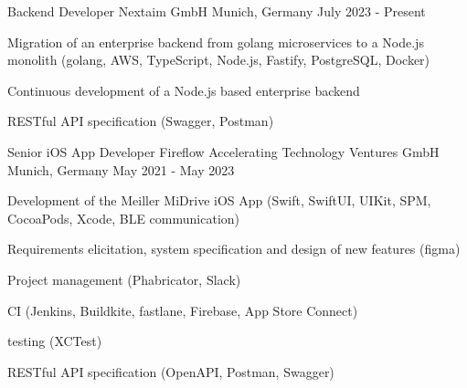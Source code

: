 


\begin{cventries}


\cventry
{Backend Developer} %
{Nextaim GmbH} %
{Munich, Germany} %
{July 2023 - Present} %
{ %
\begin{cvitems}
\item {Migration of an enterprise backend from golang microservices to a Node.js monolith (golang, AWS, TypeScript, Node.js, Fastify, PostgreSQL, Docker)}
\item {Continuous development of a Node.js based enterprise backend}
\item {RESTful API specification (Swagger, Postman)}
\end{cvitems}
}


\cventry
{Senior iOS App Developer} %
{Fireflow Accelerating Technology Ventures GmbH} %
{Munich, Germany} %
{May 2021 - May 2023} %
{ %
\begin{cvitems}
\item {Development of the Meiller MiDrive iOS App (Swift, SwiftUI, UIKit, SPM, CocoaPods, Xcode, BLE communication)}
\item {Requirements elicitation, system specification and design of new features (figma)}
\item {Project management (Phabricator, Slack)}
\item {CI (Jenkins, Buildkite, fastlane, Firebase, App Store Connect)}
\item {testing (XCTest)}
\item {RESTful API specification (OpenAPI, Postman, Swagger)}
\end{cvitems}
}



\end{cventries}
